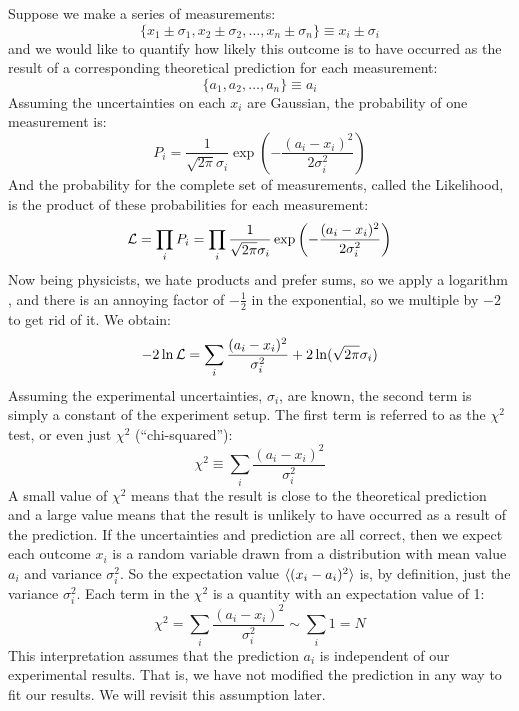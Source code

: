 \documentclass[12pt,oneside]{book}
\begin{document}
Suppose we make a series of measurements:
\begin{displaymath}
\{x_1 \pm \sigma_1, x_2 \pm \sigma_2, \ldots, x_n \pm \sigma_n \} \equiv x_i \pm \sigma_i
\end{displaymath}
and we would like to quantify how likely this outcome is to have occurred as the result of a corresponding theoretical prediction for each measurement:
\begin{displaymath}
\{a_1, a_2, \ldots, a_n \} \equiv a_i
\end{displaymath}
Assuming the uncertainties on each $x_i$ are Gaussian, the probability of one measurement is:
\begin{displaymath}
P_i = \frac{1}{\sqrt{2 \pi} \sigma_i}  \exp\left( - \frac{(a_i-x_i)^2}{2\sigma_i^2}\right)
\end{displaymath}
And the probability for the complete set of measurements, called the Likelihood, is the product of these probabilities for each measurement:
\begin{displaymath}
{\cal L} = \prod_i P_i = \prod_i \frac{1}{\sqrt{2 \pi} \sigma_i}  \exp\left( - \frac{(a_i-x_i)^2}{2\sigma_i^2}\right)
\end{displaymath}
Now being physicists, we hate products and prefer sums, so we apply a logarithm , and there is an annoying factor of $-\frac{1}{2}$ in the exponential, so we multiple by $-2$ to get rid of it.  We obtain:
\begin{equation}
-2 \ln {\cal L} = \sum_i \frac{(a_i-x_i)^2}{\sigma_i^2} + 2 \ln(\sqrt{2\pi}\sigma_i)
\end{equation}
Assuming the experimental uncertainties, $\sigma_i$, are known, the
second term is simply a constant of the experiment setup.  The first
term is referred to as the $\chi^2$ test, or even just $\chi^2$ (``chi-squared''):
\begin{equation}
\chi^2 \equiv \sum_i \frac{(a_i-x_i)^2}{\sigma_i^2} 
\end{equation}
A small value of $\chi^2$ means that the result is close to the
theoretical prediction and a large value means that the result is
unlikely to have occurred as a result of the prediction.  If the
uncertainties and prediction are all correct, then we expect each outcome $x_i$ is a random variable drawn from a distribution with mean value $a_i$ and variance $\sigma_i^2$.  So the expectation value $\braket{(x_i - a_i)^2}$ is, by definition, just the variance $\sigma_i^2$.  Each term in the $\chi^2$ is a quantity with an expectation value of 1:
\begin{equation}
\chi^2 = \sum_i \frac{(a_i-x_i)^2}{\sigma_i^2} \sim \sum_i 1 = N
\end{equation}
This interpretation assumes that the prediction $a_i$ is independent
of our experimental results.  That is, we have not modified the
prediction in any way to fit our results.  We will revisit this
assumption later.
\end{document}
